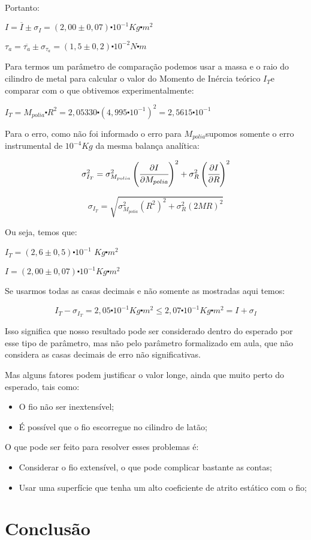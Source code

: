 \documentclass{article}
\begin{document}
Portanto:

$I=\overline{I}\pm\sigma_{I}=(2,00\pm0,07)\centerdot10^{-1}$$Kg\centerdot m^{2}$

$\tau_{a}=\overline{\tau_{a}}\pm\sigma_{\tau_{a}}=(1,5\pm0,2)\centerdot10^{-2}$$N\centerdot m$

Para termos um parâmetro de comparação podemos usar a massa e o raio
do cilindro de metal para calcular o valor do Momento de Inércia teórico
$I_{T}$e comparar com o que obtivemos experimentalmente:

$I_{T}=M_{polia}\centerdot R^{2}=2,05330\centerdot(4,995\centerdot10^{-1})^{2}=2,5615\centerdot10^{-1}$

Para o erro, como não foi informado o erro para $M_{polia}$supomos
somente o erro instrumental de $10^{-4}$$Kg$ da mesma balança analítica:

\[
\sigma_{I_{T}}^{2}=\sigma_{M_{polia}}^{2}\left(\cfrac{\partial I}{\partial M_{polia}}\right)^{2}+\sigma_{R}^{2}\left(\cfrac{\partial I}{\partial R}\right)^{2}
\]


\[
\sigma_{I_{T}}=\sqrt{\sigma_{M_{polia}}^{2}\left(R^{2}\right)^{2}+\sigma_{R}^{2}\left(2MR\right)^{2}}
\]


Ou seja, temos que:

$I_{T}=(2,6\pm0,5)\centerdot10^{-1}$ $Kg\centerdot m^{2}$

$I=$$(2,00\pm0,07)\centerdot10^{-1}$$Kg\centerdot m^{2}$

Se usarmos todas as casas decimais e não somente as mostradas aqui
temos:

\[
I_{T}-\sigma_{I_{T}}=2,05\centerdot10^{-1}Kg\centerdot m^{2}\leq2,07\centerdot10^{-1}Kg\centerdot m^{2}=I+\sigma_{I}
\]


Isso significa que nosso resultado pode ser considerado dentro do
esperado por esse tipo de parâmetro, mas não pelo parâmetro formalizado
em aula, que não considera as casas decimais de erro não significativas.

Mas alguns fatores podem justificar o valor longe, ainda que muito
perto do esperado, tais como:
\begin{itemize}
	\item O fio não ser inextensível;
	\item É possível que o fio escorregue no cilindro de latão;
\end{itemize}
O que pode ser feito para resolver esses problemas é:
\begin{itemize}
	\item Considerar o fio extensível, o que pode complicar bastante as contas;
	\item Usar uma superfície que tenha um alto coeficiente de atrito estático
	com o fio;
\end{itemize}

\section{Conclusão}
\end{document}
